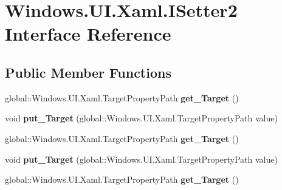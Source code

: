 \hypertarget{interface_windows_1_1_u_i_1_1_xaml_1_1_i_setter2}{}\section{Windows.\+U\+I.\+Xaml.\+I\+Setter2 Interface Reference}
\label{interface_windows_1_1_u_i_1_1_xaml_1_1_i_setter2}
\subsection*{Public Member Functions}
\begin{DoxyCompactItemize}
\item 
\mbox{\label{interface_windows_1_1_u_i_1_1_xaml_1_1_i_setter2_a39b568010bc59926a8e2729ca6ab951d}} 
global\+::\+Windows.\+U\+I.\+Xaml.\+Target\+Property\+Path {\bfseries get\+\_\+\+Target} ()
\item 
\mbox{\label{interface_windows_1_1_u_i_1_1_xaml_1_1_i_setter2_ac9ec74ff10779379bf48722561a84016}} 
void {\bfseries put\+\_\+\+Target} (global\+::\+Windows.\+U\+I.\+Xaml.\+Target\+Property\+Path value)
\item 
\mbox{\label{interface_windows_1_1_u_i_1_1_xaml_1_1_i_setter2_a39b568010bc59926a8e2729ca6ab951d}} 
global\+::\+Windows.\+U\+I.\+Xaml.\+Target\+Property\+Path {\bfseries get\+\_\+\+Target} ()
\item 
\mbox{\label{interface_windows_1_1_u_i_1_1_xaml_1_1_i_setter2_ac9ec74ff10779379bf48722561a84016}} 
void {\bfseries put\+\_\+\+Target} (global\+::\+Windows.\+U\+I.\+Xaml.\+Target\+Property\+Path value)
\item 
\mbox{\label{interface_windows_1_1_u_i_1_1_xaml_1_1_i_setter2_a39b568010bc59926a8e2729ca6ab951d}} 
global\+::\+Windows.\+U\+I.\+Xaml.\+Target\+Property\+Path {\bfseries get\+\_\+\+Target} ()
\item 
\mbox{\label{interface_windows_1_1_u_i_1_1_xaml_1_1_i_setter2_ac9ec74ff10779379bf48722561a84016}} 

\end{DoxyCompactItemize}
